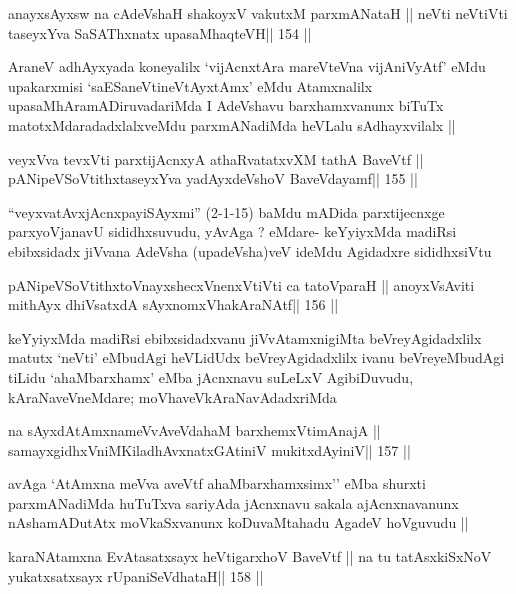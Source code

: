 \begin{shl}
anayxsAyxsw na cA\s\s deVshaH shakoyxV vakutxM parxmANataH ||
neVti neVtiVti taseyxYva SaSAThxnatx upasaMhaqteVH\hfill || 154 ||
\end{shl}

\begin{artha}
AraneV adhAyxyada koneyalilx `vijAcnxtAra mareVteVna vijAniVyAtf' eMdu
upakarxmisi `saESaneVtineVtAyxtAmx' eMdu Atamxnalilx
upasaMhAramADiruvadariMda I AdeVshavu barxhamxvanunx biTuTx
matotxMdaradadxlalxveMdu parxmANadiMda heVLalu sAdhayxvilalx ||
\end{artha}

\begin{shl}
veyxVva tevxVti parxtijAcnxyA athaRvatatxvXM tathA BaveVtf ||
pANipeVSoVtithxtaseyxYva yadAyxdeVshoV BaveVdayamf\hfill || 155 ||
\end{shl}

\begin{artha}
``veyxvatAvxjAcnxpayiSAyxmi'' (2-1-15) baMdu mADida parxtijecnxge
  parxyoVjanavU sididhxsuvudu, yAvAga ? eMdare- keYyiyxMda madiRsi
  ebibxsidadx jiVvana AdeVsha (upadeVsha)veV ideMdu Agidadxre sididhxsiVtu
\end{artha}

\begin{shl}
pANipeVSoVtithxtoV\s nayxshecxVnenxVtiVti ca tatoV\s paraH ||
anoyxV\s sAviti mithAyx dhiVsatxdA sAyxnomxVhakAraNAtf\hfill || 156 ||
\end{shl}

\begin{artha}
keYyiyxMda madiRsi ebibxsidadxvanu jiVvAtamxnigiMta beVreyAgidadxlilx
matutx `neVti' eMbudAgi heVLidUdx beVreyAgidadxlilx ivanu
beVreyeMbudAgi tiLidu `ahaMbarxhamx' eMba jAcnxnavu suLeLxV
AgibiDuvudu, kAraNaveVneMdare; moVhaveVkAraNavAdadxriMda
\end{artha}

\begin{shl}
na sAyxdAtAmxnameVvAveVdahaM barxhemxVtimAnajA ||
samayxgidhxVniMKiladhAvxnatxGAtiniV mukitxdAyiniV\hfill || 157 ||
\end{shl}

\begin{artha}
avAga `AtAmxna meVva aveVtf ahaMbarxhamxsimx'' eMba shurxti
parxmANadiMda huTuTxva sariyAda jAcnxnavu sakala ajAcnxnavanunx
nAshamADutAtx moVkaSxvanunx koDuvaMtahadu AgadeV hoVguvudu ||
\end{artha}

\begin{shl}
karaNAtamxna EvAtasatxsayx heVtigarxhoV BaveVtf ||
na tu tatAsxkiSxNoV yukatxsatxsayx rUpaniSeVdhataH\hfill || 158 ||
\end{shl}

